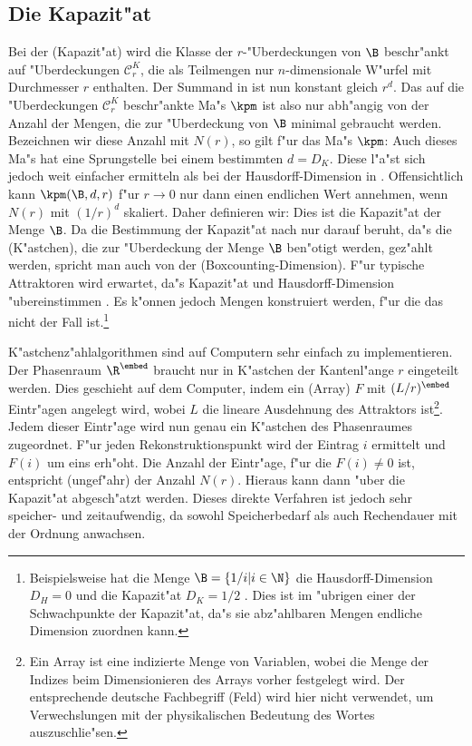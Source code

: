 \subsection{Die Kapazit"at}
\label{chapcapacity}
Bei der \begriff(Kapazit"at) wird die Klasse der
$r$-"Uberdeckungen von $\B$ beschr"ankt auf "Uberdeckungen $\mathcal C^K_r$, die als Teilmengen nur
$n$-dimensionale W"urfel mit Durchmesser $r$ enthalten. Der Summand in
 ist nun konstant gleich $r^d$. Das auf die "Uberdeckungen $\mathcal C^K_r$
beschr"ankte Ma"s $\kpm$ ist also nur abh"angig von der Anzahl der Mengen, die zur "Uberdeckung
von $\B$ minimal gebraucht werden. Bezeichnen wir diese Anzahl mit $N(r)$, so gilt f"ur das
Ma"s $\kpm$:
Auch dieses Ma"s hat eine Sprungstelle bei einem bestimmten $d=D_K$. Diese l"a"st sich 
jedoch weit einfacher ermitteln als bei der Hausdorff-Dimension in
. Offensichtlich kann $\kpm(\B,d,r)$ f"ur $r\to0$ nur dann einen
endlichen Wert annehmen, wenn $N(r)$ mit $(1/r)^d$ skaliert. Daher definieren wir:
Dies ist die Kapazit"at der Menge $\B$. Da die Bestimmung der Kapazit"at nach
 nur darauf beruht, da"s die \naja(K"astchen), die zur "Uberdeckung der
Menge $\B$ ben"otigt werden, gez"ahlt werden, spricht man auch von der
\begriff(Boxcounting-Dimension). F"ur typische Attraktoren
wird erwartet, da"s Kapazit"at und Hausdorff-Dimension "ubereinstimmen
\cite{Farmer-ott-yorke}. Es k"onnen jedoch Mengen konstruiert werden, f"ur die das nicht der 
Fall ist.\footnote{Beispielsweise hat die Menge $\B=\{1/i\vert i\in\N\}$ die 
Hausdorff-Dimension $D_H=0$ und die Kapazit"at $D_K=1/2$ \cite{Leven89}. Dies ist im "ubrigen einer der
Schwachpunkte der Kapazit"at, da"s sie abz"ahlbaren Mengen endliche Dimension zuordnen kann.}

K"astchenz"ahlalgorithmen sind auf Computern sehr einfach zu implementieren. Der
Phasenraum $\R^\embed$ braucht nur in K"astchen der Kantenl"ange $r$ eingeteilt werden.
Dies geschieht auf dem Computer, indem ein \begriff(Array) $F$ mit $(L/r)^\embed$ Eintr"agen
angelegt wird, wobei $L$ die lineare Ausdehnung des Attraktors ist\footnote{Ein Array ist
  eine indizierte Menge von Variablen, wobei die Menge der Indizes beim Dimensionieren des
  Arrays vorher festgelegt wird. Der entsprechende deutsche Fachbegriff \naja(Feld) wird
  hier nicht verwendet, um Verwechslungen mit der physikalischen Bedeutung des Wortes
  auszuschlie"sen.}. Jedem dieser Eintr"age wird nun genau ein K"astchen des Phasenraumes
zugeordnet. F"ur jeden Rekonstruktionspunkt wird der Eintrag $i$ ermittelt und $F(i)$ um
eins erh"oht. Die Anzahl der Eintr"age, f"ur die $F(i)\neq 0$ ist, entspricht (ungef"ahr) der
Anzahl $N(r)$. Hieraus kann dann "uber  die Kapazit"at abgesch"atzt
werden. Dieses direkte Verfahren ist jedoch sehr speicher- und zeitaufwendig, da sowohl
Speicherbedarf als auch Rechendauer mit der Ordnung  anwachsen.



